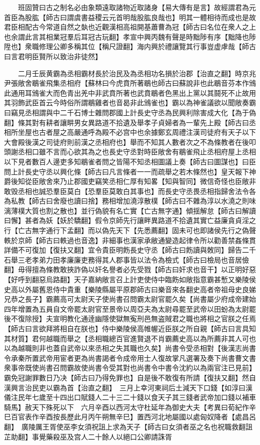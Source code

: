 　　班固贊曰古之制名必由象類遠取諸物近取諸身【易大傳有是言】故經謂君為元首臣為股肱【師古曰謂虞書益稷云元首明哉股肱良哉也】明其一體相待而成也是故君臣相配古今常道自然之埶也近觀漢相高祖開基蕭曹為冠【師古曰名位在衆人之上也余謂此言其相業冠羣后耳冠古玩翻】孝宣中興丙魏有聲是時黜陟有序【黜降也陟陞也】衆職修理公卿多稱其位【稱尺證翻】海内興於禮讓覽其行事豈虚虖哉【師古曰言君明臣賢所以致治非徒然】

　　二月壬辰黄霸為丞相霸材長於治民及為丞相功名損於治郡【治直之翻】時京兆尹張敞舍鶡雀飛集丞相府【蘇林曰今虎賁所著鶡也師古曰蘇說非也此鶡音芬本作鳻此通用耳鳻雀大而色青出羌中非武賁所著也武賁鶡者色黑出上黨以其鬪死不止故用其羽飾武臣首云今時俗所謂鶡雞者也音曷非此鳻雀也】霸以為神雀議欲以聞敞奏霸曰竊見丞相謂與中二千石博士雜問郡國上計長史守丞為民興利除害成大化【為于偽翻】條其對有耕者讓畊男女異路道不拾遺及舉孝子貞婦者為一輩先上殿【師古曰丞相所坐屋也古者屋之高嚴通呼為殿不必宫中也余據鄭玄周禮注漢司徒府有天子以下大會殿後漢之司徒府則前漢之丞相府也】舉而不知其人數者次之不為條教者在後叩頭謝丞相口雖不言而心欲其為之也長史守丞對時臣敞舍有鶡雀飛止丞相府屋上丞相以下見者數百人邊吏多知鶡雀者問之皆陽不知丞相圖議上奏【師古曰圖謀也】曰臣問上計長史守丞以興化條【師古曰凡言條者一一而疏舉之若木條然也】皇天報下神爵後知從臣敞舍來乃止郡國吏竊笑丞相仁厚有知畧【知與智同】微信奇怪也臣敞非敢毁丞相也誠恐羣臣莫白【恐羣臣莫敢白其事也】而長史守丞畏丞相指歸舍法令各為私教【師古曰舍廢也讀曰捨】務相增加澆淳散樸【師古曰不雜為淳以水澆之則味漓薄樸大質也割之散也】並行偽貌有名亡實【亡古無字通】傾揺解怠【師古曰解讀曰懈】甚者為妖【妖於驕翻】假令京師先行讓畔異路道不拾遺其實亡益廉貪貞淫之行【亡古無字通行下孟翻】而以偽先天下【先悉薦翻】固未可也即諸侯先行之偽聲軼於京師【師古曰軼過也音逸】非細事也漢家承敝通變造起律令所以勸善禁姦條貫詳備不可復加【復扶又翻】宜令貴臣明飭長史守丞【師古曰飭讀與敇同】歸告二千石舉三老孝弟力田孝廉廉吏務得其人郡事皆以法令為檢式【師古曰檢局也音居儉翻】毋得擅為條教敢挾詐偽以奸名譽者必先受戮【師古曰奸求也音干】以正明好惡【好呼到翻惡烏路翻】天子嘉納敞言召上計吏使侍中臨飭如敞指意霸甚慙又樂陵侯史高以外屬舊恩侍中貴重【樂陵縣屬平原郡師古曰樂音來各翻史高者帝祖母史良娣兄恭之長子】霸薦高可太尉天子使尚書召問霸太尉官罷久矣【尚書屬少府成帝建始四年增置為五員自文帝罷太尉官至景帝以周亞夫為太尉尋罷至武帝以田蚡為太尉罷後不復除授】夫宣明教化通逹幽隱使獄無寃刑邑無盗賊君之職也將相之官朕之任焉【師古曰言欲拜將相自在朕也】侍中樂陵侯高帷幄近臣朕之所自親【師古曰言具知其材質】君何越職而舉之【丞相職總百官進賢退不肖霸薦史高以為所薦非其人可也以為越職則非也蓋自武帝以來丞相之失其職也久矣】尚書令受丞相對【後漢志尚書令承秦所置武帝用宦者更為尚書謁者令成帝用士人復故掌凡選署及奏下尚書曹文書衆事帝既使尚書召問霸故使尚書令受其對也尚書令中書令沈約以為兩官注已見前】霸免冠謝罪數日乃决【師古曰乃得免罪也】自是後不敢復有所請【復扶又翻】然自漢興言治民吏以霸為首【治直之翻】　三月上幸河東祠后土減天下口錢【如淳曰漢儀注民年七歲至十四出口賦錢人二十三二十錢以食天子其三錢者武帝加口錢以補車騎馬】赦天下殊死以下　六月辛酉以西河太守杜延年為御史大夫【考異曰荀紀作辛巳百官表作辛酉按長歷此月丙午朔無辛巳】置西河北地屬國以處匈奴降者【處昌呂翻】　廣陵厲王胥使巫李女須祝詛上求為天子【師古曰女須者巫之名也祝職救翻詛芷助翻】事覺藥殺巫及宫人二十餘人以絕口公卿請誅胥

